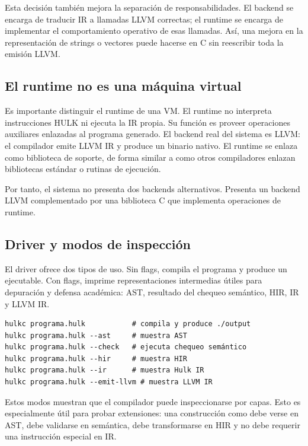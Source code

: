 \documentclass[12pt,letterpaper]{article}
\newcommand{\repo}[1]{\texttt{\detokenize{#1}}}
\newcommand{\hulk}{\textsc{HULK}}
\begin{document}
Esta decisión también mejora la separación de responsabilidades. El backend se encarga de traducir IR a llamadas LLVM correctas; el runtime se encarga de implementar el comportamiento operativo de esas llamadas. Así, una mejora en la representación de strings o vectores puede hacerse en C sin reescribir toda la emisión LLVM.

\subsection{El runtime no es una máquina virtual}

Es importante distinguir el runtime de una VM. El runtime no interpreta instrucciones \hulk{} ni ejecuta la IR propia. Su función es proveer operaciones auxiliares enlazadas al programa generado. El backend real del sistema es LLVM: el compilador emite LLVM IR y \repo{clang} produce un binario nativo. El runtime se enlaza como biblioteca de soporte, de forma similar a como otros compiladores enlazan bibliotecas estándar o rutinas de ejecución.

Por tanto, el sistema no presenta dos backends alternativos. Presenta un backend LLVM complementado por una biblioteca C que implementa operaciones de runtime.

\subsection{Driver y modos de inspección}

El driver ofrece dos tipos de uso. Sin flags, compila el programa y produce un ejecutable. Con flags, imprime representaciones intermedias útiles para depuración y defensa académica: AST, resultado del chequeo semántico, HIR, IR y LLVM IR.

\begin{lstlisting}[language=IR,caption={Uso esperado del driver}]
hulkc programa.hulk           # compila y produce ./output
hulkc programa.hulk --ast     # muestra AST
hulkc programa.hulk --check   # ejecuta chequeo semántico
hulkc programa.hulk --hir     # muestra HIR
hulkc programa.hulk --ir      # muestra Hulk IR
hulkc programa.hulk --emit-llvm # muestra LLVM IR
\end{lstlisting}

Estos modos muestran que el compilador puede inspeccionarse por capas. Esto es especialmente útil para probar extensiones: una construcción como \repo{match} debe verse en AST, debe validarse en semántica, debe transformarse en HIR y no debe requerir una instrucción especial en IR.
\end{document}
